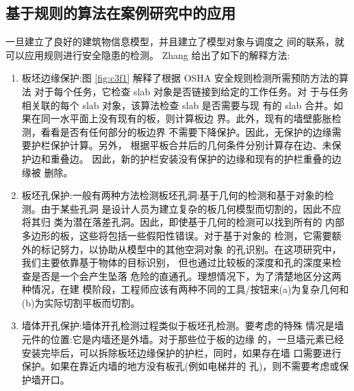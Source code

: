 \subsection{基于规则的算法在案例研究中的应用}

一旦建立了良好的建筑物信息模型，并且建立了模型对象与调度之
间的联系，就可以应用规则进行安全隐患的检测。 Zhang 给出了如下的解释方法:

\begin{enumerate}
    \item 板坯边缘保护:图 \ref{fig:c3f1} 解释了根据 OSHA 安全规则检测所需预防方法的算法
    对于每个任务，它检查 slab 对象是否链接到给定的工作任务。对
    于与任务相关联的每个 slab 对象，该算法检查 slab 是否需要与现
    有的 slab 合并。如果在同一水平面上没有现有的板，则计算板边
    界。此外，现有的墙壁膨胀检测，看看是否有任何部分的板边界
    不需要下降保护。因此，无保护的边缘需要护栏保护计算。另外，
    根据平板合并后的几何条件分别计算存在边、未保护边和重叠边。
    因此，新的护栏安装没有保护的边缘和现有的护栏重叠的边缘被
    删除。
    \item 板坯孔保护:一般有两种方法检测板坯孔洞:基于几何的检测和基于对象的检测。由于某些孔洞
    是设计人员为建立复杂的板几何模型而切割的，因此不应将其归
    类为潜在落差孔洞。因此，即使基于几何的检测可以找到所有的
    内部多边形的板，这些将包括一些假阳性错误。对于基于对象的
    检测，它需要额外的标记努力，以协助从模型中的其他空洞对象
    的孔识别。在这项研究中，我们主要依靠基于物体的目标识别，
    但也通过比较板的深度和孔的深度来检查是否是一个会产生坠落
    危险的直通孔。理想情况下，为了清楚地区分这两种情况，在建
    模阶段，工程师应该有两种不同的工具/按钮来(a)为复杂几何和
    (b)为实际切割平板而切割。
    \item 墙体开孔保护:墙体开孔检测过程类似于板坯孔检测。要考虑的特殊
    情况是墙元件的位置:它是内墙还是外墙。对于那些位于板的边缘
    的，一旦墙元素已经安装完毕后，可以拆除板坯边缘保护的护栏，同时，如果存在墙
    口需要进行保护。如果在靠近内墙的地方没有板孔(例如电梯井的
    孔)，则不需要考虑或保护墙开口。
\end{enumerate}


